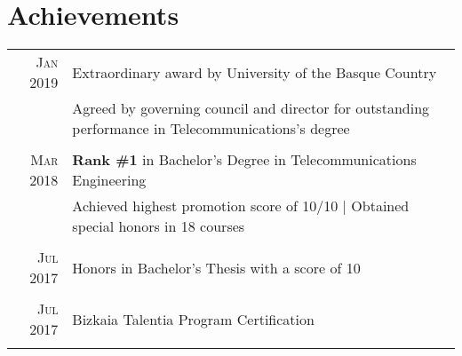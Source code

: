 \documentclass[a4paper,10pt]{article}
\begin{document}
\section{Achievements}
\begin{tabular}{rp{13.6cm}}
\textsc{Jan} 2019 & Extraordinary award by University of the Basque Country \\%
&\footnotesize{Agreed by governing council and director for outstanding performance in Telecommunications's degree} \\\vspace{-0.05in}&\\

\textsc{Mar} 2018 & \textbf{Rank \#1} in Bachelor's Degree in Telecommunications Engineering \\%
&\footnotesize{Achieved highest promotion score of 10/10 | Obtained special honors in 18 courses} \\\vspace{-0.05in}&\\

\textsc{Jul} 2017 & Honors in Bachelor's Thesis with a score of 10 \\%
\vspace{-0.05in}&\\

\textsc{Jul} 2017 & Bizkaia Talentia Program Certification \\%
\\


\end{tabular}
\end{document}
